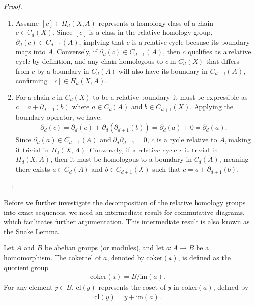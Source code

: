 \begin{proof}\noindent
	\begin{enumerate}
		\item Assume \([c] \in H_{d}(X, A)\) represents a homology class of a chain \( c \in C_{d}(X) \). Since \([c]\) is a class in the relative homology group, \( \partial_{d}(c) \in C_{d-1}(A) \), implying that \( c \) is a relative cycle because its boundary maps into \( A \). Conversely, if \( \partial_{d}(c) \in C_{d-1}(A) \), then \( c \) qualifies as a relative cycle by definition, and any chain homologous to \( c \) in \( C_{d}(X) \) that differs from \( c \) by a boundary in \( C_{d}(A) \) will also have its boundary in \( C_{d-1}(A) \), confirming \([c] \in H_{d}(X, A) \).
		\item For a chain \( c \) in \( C_{d}(X) \) to be a relative boundary, it must be expressible as \( c = a + \partial_{d+1}(b) \) where \( a \in C_{d}(A) \) and \( b \in C_{d+1}(X) \). Applying the boundary operator, we have:
		\begin{align}
		    \partial_{d}(c) = \partial_{d}(a) + \partial_{d}(\partial_{d+1}(b)) = \partial_{d}(a) + 0 = \partial_{d}(a). 
		\end{align}
		Since \( \partial_{d}(a) \in C_{d-1}(A) \) and \( \partial_{d}\partial_{d+1} = 0 \), \( c \) is a cycle relative to \( A \), making it trivial in \( H_{d}(X, A) \). Conversely, if a relative cycle \( c \) is trivial in \( H_{d}(X, A) \), then it must be homologous to a boundary in \( C_{d}(A) \), meaning there exists \( a \in C_{d}(A) \) and \( b \in C_{d+1}(X) \) such that \( c = a + \partial_{d+1}(b) \).
	\end{enumerate}
\end{proof}

Before we further investigate the decomposition of the relative homology groups into exact sequences, we need an intermediate result for commutative diagrams, which facilitates further argumentation. This intermediate result is also known as the Snake Lemma.

\begin{definition}
	Let \( A \) and \( B \) be abelian groups (or modules), and let \( a: A \to B \) be a homomorphism. The cokernel of \( a \), denoted by \( \text{coker}(a) \), is defined as the quotient group
	\begin{align}
		\text{coker}(a) = B / \text{im}(a). 
	\end{align}
	For any element \( y \in B \), \( \text{cl}(y) \) represents the coset of \( y \) in \( \text{coker}(a) \), defined by
	\begin{align}
		\text{cl}(y) = y + \text{im}(a). 
	\end{align}
\end{definition}

